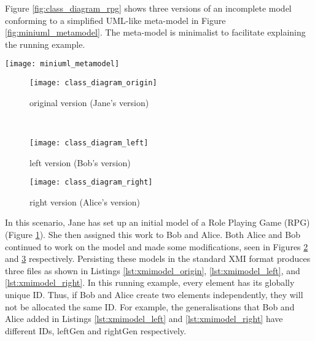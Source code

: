 Figure \ref{fig:class_diagram_rpg} shows three versions of an incomplete model conforming to a simplified UML-like meta-model in Figure \ref{fig:miniuml_metamodel}. The meta-model is minimalist to facilitate explaining the running example.

\begin{figure*}[h]
  \texttt{[image: miniuml\_metamodel]}
  \caption{An excerpt of the UML-like meta-model of the running example in Figure \ref{fig:class_diagram_rpg}.}
  \label{fig:miniuml_metamodel}
\end{figure*}

\begin{figure*}[h]
  \centering
  \begin{subfigure}[t]{0.47\linewidth}
    \texttt{[image: class\_diagram\_origin]}
    \caption{original version (Jane’s version)}
    \label{fig:class_diagram_origin}
  \end{subfigure}
  \\
  \begin{subfigure}[t]{0.47\linewidth}
    \texttt{[image: class\_diagram\_left]}
    \caption{left version (Bob’s version)}
    \label{fig:class_diagram_left}
  \end{subfigure}
  \hfill
  \begin{subfigure}[t]{0.47\linewidth}
    \texttt{[image: class\_diagram\_right]}
    \caption{right version (Alice’s version)}
    \label{fig:class_diagram_right}
  \end{subfigure}
  \caption{Three incomplete class diagrams of a Role Playing Game.}
  \label{fig:class_diagram_rpg}
\end{figure*}

In this scenario, Jane has set up an initial model of a Role Playing Game (RPG) (Figure \ref{fig:class_diagram_origin}). She then assigned this work to Bob and Alice. Both Alice and Bob continued to work on the model and made some modifications, seen in Figures \ref{fig:class_diagram_left} and \ref{fig:class_diagram_right} respectively. Persisting these models in the standard XMI \cite{omg2018xmi} format produces three files as shown in Listings \ref{lst:xmimodel_origin}, \ref{lst:xmimodel_left}, and \ref{lst:xmimodel_right}. In this running example, every element has its globally unique ID. Thus, if Bob and Alice create two elements independently, they will not be allocated the same ID. For example, the generalisations that Bob and Alice added in Listings \ref{lst:xmimodel_left} and \ref{lst:xmimodel_right} have different IDs, \textsf{leftGen} and \textsf{rightGen} respectively.

